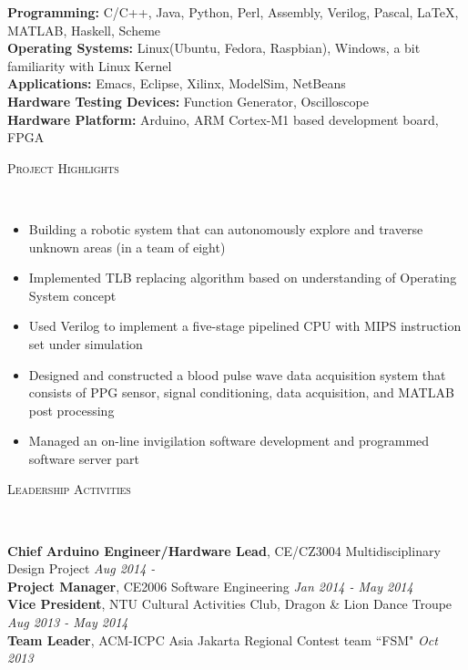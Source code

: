 \documentclass[a4paper, 10pt]{article}
\newenvironment{changemargin}[2]{%
  \begin{list}{}{%
      \setlength{\topsep}{0pt}%
      \setlength{\leftmargin}{#1}%
      \setlength{\rightmargin}{#2}%
      \setlength{\listparindent}{\parindent}%
      \setlength{\itemindent}{\parindent}%
      \setlength{\parsep}{\parskip}%
    }%
  \item[]}{\end{list}
}
\newcommand{\lineover}{
  \begin{changemargin}{-0.05in}{-0.05in}
    \vspace*{-8pt}
    \hrulefill \\
    \vspace*{-2pt}
  \end{changemargin}
}
\newcommand{\header}[1]{
  \begin{changemargin}{-0.5in}{-0.5in}
    \scshape{#1}\\
    \lineover
  \end{changemargin}
}
\newenvironment{body}
{
\vspace*{-16pt}
\begin{changemargin}{-0.25in}{-0.5in}
}	
{
\end{changemargin}
}
\begin{document}
\begin{body}
  \vspace{14pt}
  \textbf{Programming:}{} C/C++, Java, Python, Perl, Assembly, Verilog, Pascal, \LaTeX, MATLAB, Haskell, Scheme\\
  \medskip
  \textbf{Operating Systems:}{} Linux(Ubuntu, Fedora, Raspbian), Windows, a bit familiarity with Linux Kernel\\
  \medskip
  \textbf{Applications:}{} Emacs, Eclipse, Xilinx, ModelSim, NetBeans\\
  \medskip
  \textbf{Hardware Testing Devices:}{} Function Generator, Oscilloscope\\
  \medskip
  \textbf{Hardware Platform:}{} Arduino, ARM Cortex-M1 based development board, FPGA\\
\end{body}

\smallskip
\medskip
\header{Project Highlights}
\begin{body}
  \vspace{14pt}
  \begin{itemize} \itemsep 2pt
  \item Building a robotic system that can autonomously explore and traverse unknown areas (in a team of eight)
  \smallskip
  \item Implemented TLB replacing algorithm based on understanding of Operating System concept
  \smallskip
  \item Used Verilog to implement a five-stage pipelined CPU with MIPS instruction set under simulation
  \smallskip
  \item Designed and constructed a blood pulse wave data acquisition system that consists of PPG sensor, signal conditioning, data acquisition, and MATLAB post processing
  \smallskip
  \item Managed an on-line invigilation software development and programmed software server part
  \end{itemize}
\end{body}

\smallskip
\medskip
\header{Leadership Activities}

\begin{body}
  \vspace{14pt}
  \textbf{Chief Arduino Engineer/Hardware Lead}, CE/CZ3004 Multidisciplinary Design Project \hfill {} \emph{Aug 2014 - }\\
  \smallskip
  \textbf{Project Manager}, CE2006 Software Engineering \hfill {} \emph{Jan 2014 - May 2014}\\
  \smallskip
  \textbf{Vice President}, NTU Cultural Activities Club, Dragon \& Lion Dance Troupe \hfill {} \emph{Aug 2013 - May 2014}\\
  \smallskip
  \textbf{Team Leader}, ACM-ICPC Asia Jakarta Regional Contest team ``FSM" \hfill {} \emph{Oct 2013}\\
\end{body}
\end{document}
